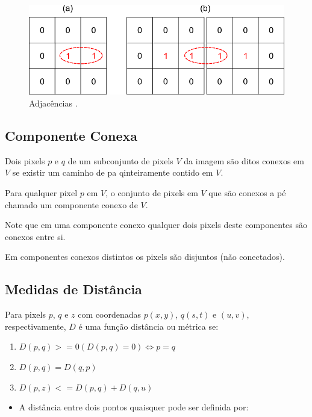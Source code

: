 \documentclass[
  brazilian,
]{book}
\providecommand{\tightlist}{%
  \setlength{\itemsep}{0pt}\setlength{\parskip}{0pt}}
\begin{document}
\begin{figure}

{\centering \includegraphics[width=0.55\linewidth]{imagens/02-formacao/adjacencia} 

}

\caption{Adjacências \autocite{thome2017}.}\label{fig:adjacencia}
\end{figure}

\hypertarget{componente-conexa}{%
\subsection{Componente Conexa}\label{componente-conexa}}

Dois pixels \(p\) e \(q\) de um subconjunto de pixels \(V\) da imagem são ditos conexos em \(V\) se existir um caminho de pa qinteiramente contido em \(V\).

Para qualquer pixel \(p\) em \(V\), o conjunto de pixels em \(V\) que são conexos a pé chamado um componente conexo de \(V\).

Note que em uma componente conexo qualquer dois pixels deste componentes são conexos entre si.

Em componentes conexos distintos os pixels são disjuntos (não conectados).

\hypertarget{medidas-de-distuxe2ncia}{%
\subsection{Medidas de Distância}\label{medidas-de-distuxe2ncia}}

Para pixels \(p\), \(q\) e \(z\) com coordenadas \(p(x,y)\), \(q(s,t)\) e \((u,v)\), respectivamente, \(D\) é uma função distância ou métrica se:

\begin{enumerate}
\def\labelenumi{\arabic{enumi}.}
\tightlist
\item
  \(D(p,q) >= 0 (D(p,q) = 0 ) \Leftrightarrow p = q\)
\item
  \(D(p,q) = D(q,p)\)
\item
  \(D(p,z) <= D(p,q) + D(q,u)\)
\end{enumerate}

\begin{itemize}
\tightlist
\item
  A distância entre dois pontos quaisquer pode ser definida por:
\end{itemize}
\end{document}
